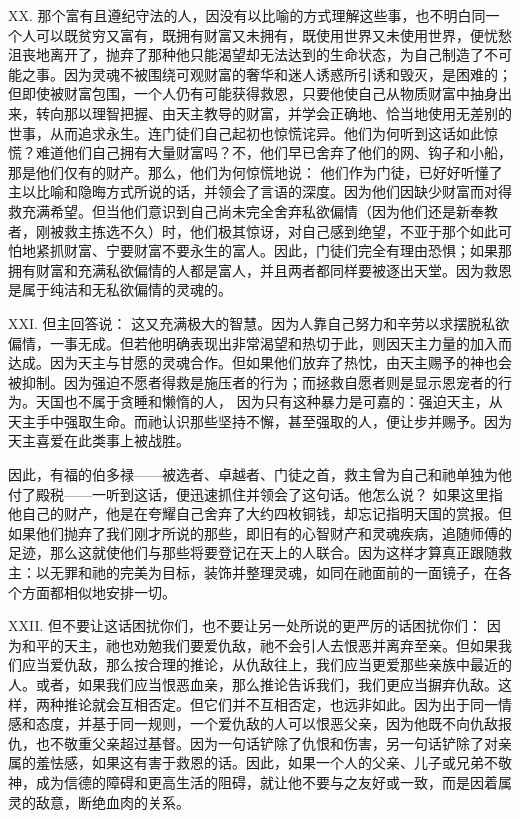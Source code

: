 XX. 那个富有且遵纪守法的人，因没有以比喻的方式理解这些事，也不明白同一个人可以既贫穷又富有，既拥有财富又未拥有，既使用世界又未使用世界，便忧愁沮丧地离开了，抛弃了那种他只能渴望却无法达到的生命状态，为自己制造了不可能之事。因为灵魂不被围绕可观财富的奢华和迷人诱惑所引诱和毁灭，是困难的；但即使被财富包围，一个人仍有可能获得救恩，只要他使自己从物质财富中抽身出来，转向那以理智把握、由天主教导的财富，并学会正确地、恰当地使用无差别的世事，从而追求永生。连门徒们自己起初也惊慌诧异。他们为何听到这话如此惊慌？难道他们自己拥有大量财富吗？不，他们早已舍弃了他们的网、钩子和小船，那是他们仅有的财产。那么，他们为何惊慌地说： 他们作为门徒，已好好听懂了主以比喻和隐晦方式所说的话，并领会了言语的深度。因为他们因缺少财富而对得救充满希望。但当他们意识到自己尚未完全舍弃私欲偏情（因为他们还是新奉教者，刚被救主拣选不久）时，他们极其惊讶，对自己感到绝望，不亚于那个如此可怕地紧抓财富、宁要财富不要永生的富人。因此，门徒们完全有理由恐惧；如果那拥有财富和充满私欲偏情的人都是富人，并且两者都同样要被逐出天堂。因为救恩是属于纯洁和无私欲偏情的灵魂的。\par

XXI. 但主回答说： 这又充满极大的智慧。因为人靠自己努力和辛劳以求摆脱私欲偏情，一事无成。但若他明确表现出非常渴望和热切于此，则因天主力量的加入而达成。因为天主与甘愿的灵魂合作。但如果他们放弃了热忱，由天主赐予的神也会被抑制。因为强迫不愿者得救是施压者的行为；而拯救自愿者则是显示恩宠者的行为。天国也不属于贪睡和懒惰的人， 因为只有这种暴力是可嘉的：强迫天主，从天主手中强取生命。而祂认识那些坚持不懈，甚至强取的人，便让步并赐予。因为天主喜爱在此类事上被战胜。\par

因此，有福的伯多禄——被选者、卓越者、门徒之首，救主曾为自己和祂单独为他付了殿税——一听到这话，便迅速抓住并领会了这句话。他怎么说？ 如果这里指他自己的财产，他是在夸耀自己舍弃了大约四枚铜钱，却忘记指明天国的赏报。但如果他们抛弃了我们刚才所说的那些，即旧有的心智财产和灵魂疾病，追随师傅的足迹，那么这就使他们与那些将要登记在天上的人联合。因为这样才算真正跟随救主：以无罪和祂的完美为目标，装饰并整理灵魂，如同在祂面前的一面镜子，在各个方面都相似地安排一切。\par

XXII.  但不要让这话困扰你们，也不要让另一处所说的更严厉的话困扰你们：  因为和平的天主，祂也劝勉我们要爱仇敌，祂不会引人去恨恶并离弃至亲。但如果我们应当爱仇敌，那么按合理的推论，从仇敌往上，我们应当更爱那些亲族中最近的人。或者，如果我们应当恨恶血亲，那么推论告诉我们，我们更应当摒弃仇敌。这样，两种推论就会互相否定。但它们并不互相否定，也远非如此。因为出于同一情感和态度，并基于同一规则，一个爱仇敌的人可以恨恶父亲，因为他既不向仇敌报仇，也不敬重父亲超过基督。因为一句话铲除了仇恨和伤害，另一句话铲除了对亲属的羞怯感，如果这有害于救恩的话。因此，如果一个人的父亲、儿子或兄弟不敬神，成为信德的障碍和更高生活的阻碍，就让他不要与之友好或一致，而是因着属灵的敌意，断绝血肉的关系。\par

